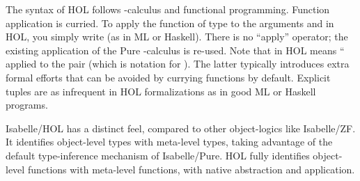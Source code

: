 \begin{isabellebody}
\begin{isamarkuptext}
  \medskip The syntax of HOL follows -calculus and
  functional programming.  Function application is curried.  To apply
  the function  of type  to the
  arguments  and  in HOL, you simply write  (as in ML or Haskell).  There is no ``apply'' operator; the
  existing application of the Pure -calculus is re-used.
  Note that in HOL  means `` applied to
  the pair  (which is notation for ).  The latter typically introduces extra formal efforts that can
  be avoided by currying functions by default.  Explicit tuples are as
  infrequent in HOL formalizations as in good ML or Haskell programs.

  \medskip Isabelle/HOL has a distinct feel, compared to other
  object-logics like Isabelle/ZF.  It identifies object-level types
  with meta-level types, taking advantage of the default
  type-inference mechanism of Isabelle/Pure.  HOL fully identifies
  object-level functions with meta-level functions, with native
  abstraction and application.


\end{isamarkuptext}
\end{isabellebody}
